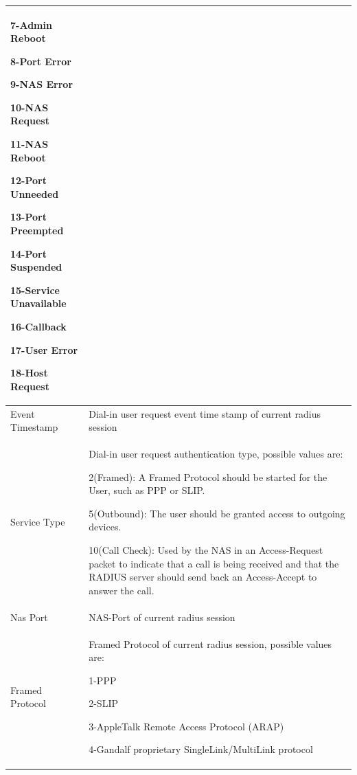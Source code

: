 \begin{longtable}{p{}|p{}}
                                            7-Admin Reboot


                                            8-Port Error


                                            9-NAS Error


                                            10-NAS Request


                                            11-NAS Reboot


                                            12-Port Unneeded


                                            13-Port Preempted


                                            14-Port Suspended


                                            15-Service Unavailable


                                            16-Callback


                                            17-User Error


                                            18-Host Request \\\hline
    Event Timestamp &	Dial-in user request event time stamp of current radius session \\\hline
    Service Type &	Dial-in user request authentication type, possible values are:


                    2(Framed): A Framed Protocol should be started for the User, such as PPP or SLIP.


                    5(Outbound): The user should be granted access to outgoing devices. 


                    10(Call Check): Used by the NAS in an Access-Request packet to indicate that a call is being received and that the RADIUS server should send back an Access-Accept to answer the call. \\\hline
    Nas Port &	NAS-Port of current radius session \\\hline
    Framed Protocol &	Framed Protocol of current radius session, possible values are:


                        1-PPP


                        2-SLIP


                        3-AppleTalk Remote Access Protocol (ARAP)


                        4-Gandalf proprietary SingleLink/MultiLink protocol



\end{longtable}
